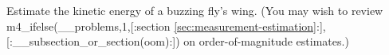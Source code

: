         Estimate the kinetic energy of a buzzing fly's wing.
(You may wish to review 
m4_ifelse(__problems,1,[:section \ref{sec:measurement-estimation}:],[:__subsection_or_section(oom):])
on order-of-magnitude estimates.)

